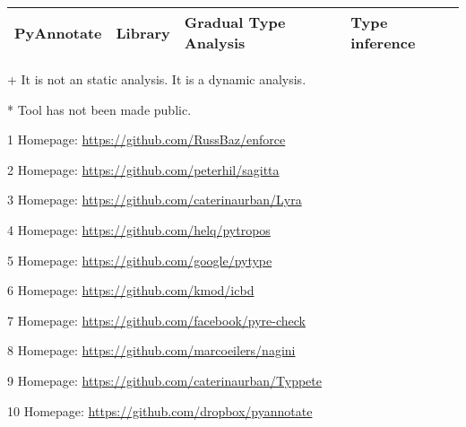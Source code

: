 \begin{sidewaystable}[p]
\begin{threeparttable}
\begin{longtable}[]{|l|l|l|l|}
    PyAnnotate\tnote{+}                                  & Library & Gradual Type Analysis   & Type inference              \tabularnewline
  \bottomrule
\end{longtable}
\begin{tablenotes}
  \item[+] \footnotesize It is not an static analysis. It is a dynamic analysis.
  \item[*] Tool has not been made public.
  \item[1] Homepage: \url{https://github.com/RussBaz/enforce}
  \item[2] Homepage: \url{https://github.com/peterhil/sagitta}
  \item[3] Homepage: \url{https://github.com/caterinaurban/Lyra}
  \item[4] Homepage: \url{https://github.com/helq/pytropos}
  \item[5] Homepage: \url{https://github.com/google/pytype}
  \item[6] Homepage: \url{https://github.com/kmod/icbd}
  \item[7] Homepage: \url{https://github.com/facebook/pyre-check}
  \item[8] Homepage: \url{https://github.com/marcoeilers/nagini}
  \item[9] Homepage: \url{https://github.com/caterinaurban/Typpete}
  \item[10] Homepage: \url{https://github.com/dropbox/pyannotate}
\end{tablenotes}
\end{threeparttable}
\end{sidewaystable}


%
%


